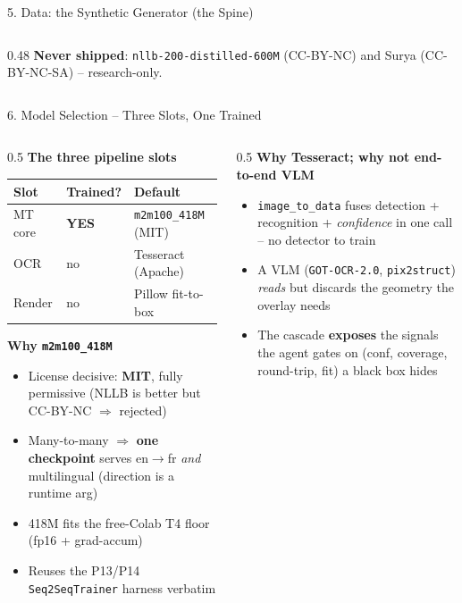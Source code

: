 \documentclass[10pt,aspectratio=169]{beamer}
\begin{document}
\begin{frame}{5. Data: the Synthetic Generator (the Spine)}
\begin{columns}[T]
\begin{column}{0.48\textwidth}
\vspace{0.05cm}
\scriptsize \textbf{Never shipped}: \texttt{nllb-200-distilled-600M} (CC-BY-NC) and Surya (CC-BY-NC-SA) -- research-only.
\end{column}
\end{columns}
\end{frame}

\begin{frame}{6. Model Selection -- Three Slots, One Trained}
\begin{columns}[T]
\begin{column}{0.5\textwidth}
\textbf{The three pipeline slots}
\begin{table}[h]
\centering\scriptsize
\begin{tabular}{lll}
\toprule
\textbf{Slot} & \textbf{Trained?} & \textbf{Default} \\
\midrule
MT core & \textbf{YES} & \texttt{m2m100\_418M} (MIT) \\
OCR & no & Tesseract (Apache) \\
Render & no & Pillow fit-to-box \\
\bottomrule
\end{tabular}
\end{table}

\textbf{Why \texttt{m2m100\_418M}}
\begin{itemize}\scriptsize
  \item License decisive: \textbf{MIT}, fully permissive (NLLB is better but CC-BY-NC $\Rightarrow$ rejected)
  \item Many-to-many $\Rightarrow$ \textbf{one checkpoint} serves en$\rightarrow$fr \emph{and} multilingual (direction is a runtime arg)
  \item 418M fits the free-Colab T4 floor (fp16 + grad-accum)
  \item Reuses the P13/P14 \texttt{Seq2SeqTrainer} harness verbatim
\end{itemize}
\end{column}
\begin{column}{0.5\textwidth}
\textbf{Why Tesseract; why not end-to-end VLM}
\begin{itemize}\scriptsize
  \item \texttt{image\_to\_data} fuses detection + recognition + \emph{confidence} in one call -- no detector to train
  \item A VLM (\texttt{GOT-OCR-2.0}, \texttt{pix2struct}) \emph{reads} but discards the geometry the overlay needs
  \item The cascade \textbf{exposes} the signals the agent gates on (conf, coverage, round-trip, fit) a black box hides
\end{itemize}


\end{column}
\end{columns}
\end{frame}
\end{document}

